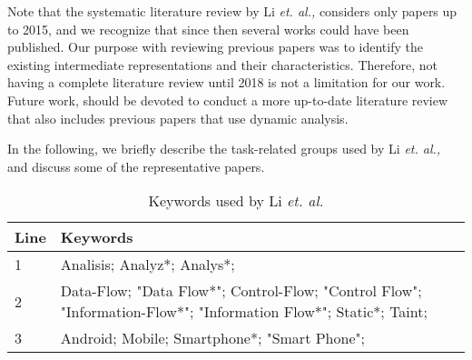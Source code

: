 Note that the systematic literature review by Li \textit{et. al.,} considers only papers up to 2015, and we recognize that since then several works could have been published. Our purpose with reviewing previous papers was to identify the existing intermediate representations and their characteristics. Therefore, not having a complete literature review until 2018 is not a limitation for our work.   Future work, should be devoted to conduct a more up-to-date literature review that also includes previous papers that use dynamic analysis.

In the following, we briefly describe the task-related groups used by Li \textit{et. al.,} and discuss some of the representative papers.
\begin{table}[t]
	\centering
		\caption{Keywords used by Li \textit{et. al.}}
	\label{table:liss}
	\begin{tabular}{|p{1cm} | p{10cm}|} 
		\hline
		Line & Keywords \\ [0.5ex] 
		\hline\hline
		1 & Analisis; Analyz*; Analys*; \\ 
		2 & Data-Flow; "Data Flow*"; Control-Flow; "Control Flow"; "Information-Flow*"; "Information Flow*"; Static*; Taint; \\
		3 & Android; Mobile; Smartphone*; "Smart Phone"; \\
		\hline
	\end{tabular}

\end{table}



%

